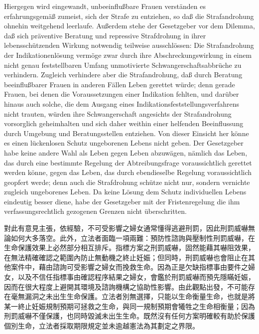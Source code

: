 \documentclass[12pt]{article}
\begin{document}
\syncleft
\begin{sourcepara}
Hiergegen wird eingewandt, unbeeinflußbare Frauen verständen es erfahrungsgemäß zumeist, sich der Strafe zu entziehen, so daß die Strafandrohung ohnehin weitgehend leerlaufe. Außerdem stehe der Gesetzgeber vor dem Dilemma, daß sich präventive Beratung und repressive Strafdrohung in ihrer lebensschützenden Wirkung notwendig teilweise ausschlössen: Die Strafandrohung der Indikationenlösung vermöge zwar durch ihre Abschreckungswirkung in einem nicht genau feststellbaren Umfang unmotivierte Schwangerschaftsabbrüche zu verhindern. Zugleich verhindere aber die Strafandrohung, daß durch Beratung beeinflußbarer Frauen in anderen Fällen Leben gerettet würde; denn gerade Frauen, bei denen die Voraussetzungen einer Indikation fehlten, und darüber hinaus auch solche, die dem Ausgang eines Indikationsfeststellungsverfahrens nicht trauten, würden ihre Schwangerschaft angesichts der Strafandrohung vorsorglich geheimhalten und sich daher weithin einer helfenden Beeinflussung durch Umgebung und Beratungsstellen entziehen. Von dieser Einsicht her könne es einen lückenlosen Schutz ungeborenen Lebens nicht geben. Der Gesetzgeber habe keine andere Wahl als Leben gegen Leben abzuwägen, nämlich das Leben, das durch eine bestimmte Regelung der Abtreibungsfrage voraussichtlich gerettet werden könne, gegen das Leben, das durch ebendieselbe Regelung voraussichtlich geopfert werde; denn auch die Strafdrohung schütze nicht nur, sondern vernichte zugleich ungeborenes Leben. Da keine Lösung dem Schutz individuellen Lebens eindeutig besser diene, habe der Gesetzgeber mit der Fristenregelung die ihm verfassungsrechtlich gezogenen Grenzen nicht überschritten.
\end{sourcepara}
\begin{transpara}
對此有意見主張，依經驗，不可受影響之婦女通常懂得逃避刑罰，因此刑罰威嚇無論如何大多落空。此外，立法者面臨一項兩難：預防性諮詢與壓制性刑罰威嚇，在生命保護效果上必然部分相互排斥。指標方案之刑罰威嚇，固然能藉其嚇阻效果，在無法精確確認之範圍內防止無動機之終止妊娠；但同時，刑罰威嚇也會阻止在其他案件中，藉由諮詢可受影響之婦女而挽救生命。因為正是欠缺指標事由要件之婦女，以及不信任指標事由確認程序結果之婦女，會鑑於刑罰威嚇而預先隱瞞妊娠，因而在很大程度上避開其環境及諮詢機構之協助性影響。由此觀點出發，不可能存在毫無漏洞之未出生生命保護。立法者別無選擇，只能以生命衡量生命，也就是將某一終止妊娠規制預期可拯救之生命，與同一規制預期會犧牲之生命相衡量；因為刑罰威嚇不僅保護，也同時毀滅未出生生命。既然沒有任何方案明確較有助於保護個別生命，立法者採取期限規定並未逾越憲法為其劃定之界限。
\end{transpara}
\end{document}

